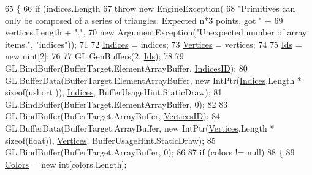 \begin{DoxyCode}
65         \{
66             \textcolor{keywordflow}{if} (indices.Length %
67                 \textcolor{keywordflow}{throw} \textcolor{keyword}{new} EngineException(
68                     \textcolor{stringliteral}{"Primitives can only be composed of a series of triangles. Expected n*3 points, got "} +
69                     vertices.Length + \textcolor{stringliteral}{"."},
70                     \textcolor{keyword}{new} ArgumentException(\textcolor{stringliteral}{"Unexpected number of array items."}, \textcolor{stringliteral}{"indices"}));
71 
72             \hyperlink{class_tri_devs_1_1_tri_engine_1_1_graphics_1_1_primitive_a9285dfb37036c35155ba83ade5c310a3}{Indices} = indices;
73             \hyperlink{class_tri_devs_1_1_tri_engine_1_1_graphics_1_1_primitive_a700451d3bd4876619fd17304d46d1d27}{Vertices} = vertices;
74 
75             \hyperlink{class_tri_devs_1_1_tri_engine_1_1_graphics_1_1_primitive_a2cc64a44370d55eb1e4673222373ab9d}{Ids} = \textcolor{keyword}{new} uint[2];
76 
77             GL.GenBuffers(2, \hyperlink{class_tri_devs_1_1_tri_engine_1_1_graphics_1_1_primitive_a2cc64a44370d55eb1e4673222373ab9d}{Ids});
78 
79             GL.BindBuffer(BufferTarget.ElementArrayBuffer, \hyperlink{class_tri_devs_1_1_tri_engine_1_1_graphics_1_1_primitive_a2cc647531c7713b290d09b0131c48411}{IndicesID});
80             GL.BufferData(BufferTarget.ElementArrayBuffer, \textcolor{keyword}{new} IntPtr(\hyperlink{class_tri_devs_1_1_tri_engine_1_1_graphics_1_1_primitive_a9285dfb37036c35155ba83ade5c310a3}{Indices}.Length * \textcolor{keyword}{sizeof}(ushort
      )), \hyperlink{class_tri_devs_1_1_tri_engine_1_1_graphics_1_1_primitive_a9285dfb37036c35155ba83ade5c310a3}{Indices}, BufferUsageHint.StaticDraw);
81             GL.BindBuffer(BufferTarget.ElementArrayBuffer, 0);
82 
83             GL.BindBuffer(BufferTarget.ArrayBuffer, \hyperlink{class_tri_devs_1_1_tri_engine_1_1_graphics_1_1_primitive_ab69b6bf1de5e766b83c4dbc19604cd3e}{VerticesID});
84             GL.BufferData(BufferTarget.ArrayBuffer, \textcolor{keyword}{new} IntPtr(\hyperlink{class_tri_devs_1_1_tri_engine_1_1_graphics_1_1_primitive_a700451d3bd4876619fd17304d46d1d27}{Vertices}.Length * \textcolor{keyword}{sizeof}(\textcolor{keywordtype}{float})), 
      \hyperlink{class_tri_devs_1_1_tri_engine_1_1_graphics_1_1_primitive_a700451d3bd4876619fd17304d46d1d27}{Vertices}, BufferUsageHint.StaticDraw);
85             GL.BindBuffer(BufferTarget.ArrayBuffer, 0);
86 
87             \textcolor{keywordflow}{if} (colors != null)
88             \{
89                 \hyperlink{class_tri_devs_1_1_tri_engine_1_1_graphics_1_1_primitive_ac2f09f32d071a3b5279951c28b094761}{Colors} = \textcolor{keyword}{new} \textcolor{keywordtype}{int}[colors.Length];

\end{DoxyCode}
